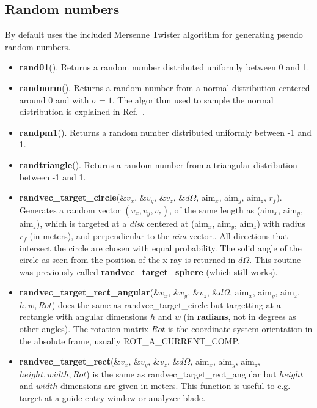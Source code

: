 \subsection{Random numbers}
By default  \MCX uses the included Mersenne Twister\cite{matsumoto1998mersenne} algorithm for generating pseudo random numbers.
\begin{itemize}
\item {\bfseries rand01}(). Returns a random number distributed uniformly between 0 and 1.
\item {\bfseries randnorm}(). Returns a random number from a normal
  distribution centered around 0 and with $\sigma=1$. The algorithm used to
  sample the normal distribution is explained in Ref.~\cite[ch.7]{num_rep}.
\item {\bfseries randpm1}(). Returns a random number distributed uniformly between -1 and 1.
\item {\bfseries randtriangle}(). Returns a random number from a triangular distribution between -1 and 1.
\item {\bfseries randvec\_target\_circle}(\&$v_x$, \&$v_y$, \&$v_z$, \&$d\Omega$,
  aim$_x$, aim$_y$, aim$_z$, $r_f$). Generates a random vector $(v_x, v_y,
  v_z)$, of the same length as (aim$_x$, aim$_y$, aim$_z$), which is
  targeted at a \emph{disk} centered at (aim$_x$, aim$_y$, aim$_z$) with
  radius $r_f$ (in meters), and perpendicular to the \emph{aim} vector.. All directions
  that intersect the circle are chosen with equal probability. The solid
  angle of the circle as seen from the position of the x-ray is returned
  in $d\Omega$. This routine was previously called {\bfseries randvec\_target\_sphere}
  (which still works).
\item {\bfseries randvec\_target\_rect\_angular}(\&$v_x$, \&$v_y$, \&$v_z$,
  \&$d\Omega$, aim$_x$, aim$_y$, aim$_z$,$h, w, Rot$) does the same as
  randvec\_target\_circle but targetting at a rectangle with angular dimensions
  $h$ and $w$ (in {\bfseries radians}, not in degrees as other angles). The
  rotation matrix $Rot$ is the coordinate system orientation in the absolute
  frame, usually ROT\_A\_CURRENT\_COMP.
\item {\bfseries randvec\_target\_rect}(\&$v_x$, \&$v_y$, \&$v_z$,
  \&$d\Omega$, aim$_x$, aim$_y$, aim$_z$,$height, width, Rot$) is the same as
  randvec\_target\_rect\_angular but $height$ and $width$ dimensions are given
  in meters. This function is useful to e.g. target at a guide entry window
  or analyzer blade.
\end{itemize}

